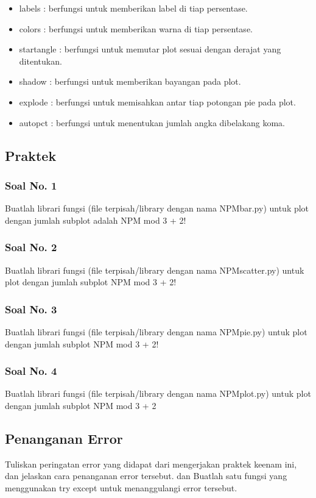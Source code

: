  \begin{itemize}
 	\item labels : berfungsi untuk memberikan label di tiap persentase.
 	\item colors : berfungsi untuk memberikan warna di tiap persentase.
 	\item startangle : berfungsi untuk memutar plot sesuai dengan derajat yang ditentukan.
 	\item shadow : berfungsi untuk memberikan bayangan pada plot.
 	\item explode : berfungsi untuk memisahkan antar tiap potongan pie pada plot.
 	\item autopct : berfungsi untuk menentukan jumlah angka dibelakang koma.
 \end{itemize}

\subsection{Praktek}
\subsubsection{Soal No. 1}
\hfill \break
Buatlah librari fungsi (file terpisah/library dengan nama NPMbar.py) untuk plot dengan jumlah subplot adalah NPM mod 3 + 2!

\subsubsection{Soal No. 2}
\hfill \break
Buatlah librari fungsi (file terpisah/library dengan nama NPMscatter.py) untuk plot dengan jumlah subplot NPM mod 3 + 2!

\subsubsection{Soal No. 3}
\hfill \break
Buatlah librari fungsi (file terpisah/library dengan nama NPMpie.py) untuk plot dengan jumlah subplot NPM mod 3 + 2!

\subsubsection{Soal No. 4}
\hfill \break
Buatlah librari fungsi (file terpisah/library dengan nama NPMplot.py) untuk plot dengan jumlah subplot NPM mod 3 + 2


\subsection{Penanganan Error}
Tuliskan  peringatan  error  yang  didapat  dari  mengerjakan  praktek  keenam  ini, dan  jelaskan  cara  penanganan  error  tersebut. dan  Buatlah  satu  fungsi  yang menggunakan try except untuk menanggulangi error tersebut.
